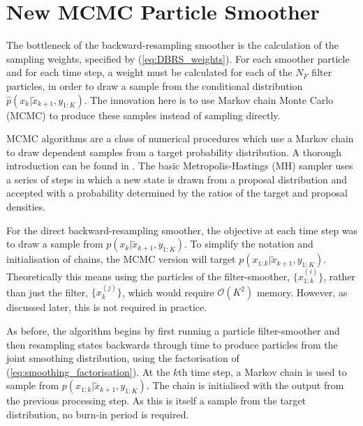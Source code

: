 \documentclass[10pt,twocolumn,twoside]{IEEEtran}
\begin{document}



\section{New MCMC Particle Smoother} \label{sec:mcmc_smoother}

The bottleneck of the backward-resampling smoother is the calculation of the sampling weights, specified by (\ref{eq:DBRS_weights}). For each smoother particle and for each time step, a weight must be calculated for each of the $N_F$ filter particles, in order to draw a sample from the conditional distribution $\hat{p}(x_k|\tilde{x}_{k+1}, y_{1:K})$. The innovation here is to use Markov chain Monte Carlo (MCMC) to produce these samples instead of sampling directly.

MCMC algorithms are a class of numerical procedures which use a Markov chain to draw dependent samples from a target probability distribution. A thorough introduction can be found in \cite{Gilks1996}. The basic Metropolis-Hastings (MH) \cite{Hastings1970} sampler uses a series of steps in which a new state is drawn from a proposal distribution and accepted with a probability determined by the ratios of the target and proposal densities.

For the direct backward-resampling smoother, the objective at each time step was to draw a sample from $p(x_{k}|\tilde{x}_{k+1}, y_{1:K})$. To simplify the notation and initialisation of chains, the MCMC version will target $p(x_{1:k}|\tilde{x}_{k+1}, y_{1:K})$. Theoretically this means using the particles of the filter-smoother, $\{x_{1:k}^{(i)}\}$, rather than just the filter, $\{x_k^{(j)}\}$, which would require $\mathcal{O}(K^2)$ memory. However, as discussed later, this is not required in practice.

As before, the algorithm begins by first running a particle filter-smoother and then resampling states backwards through time to produce particles from the joint smoothing distribution, using the factorisation of (\ref{eq:smoothing_factorisation}). At the $k$th time step, a Markov chain is used to sample from $p(x_{1:k}|\tilde{x}_{k+1}, y_{1:K})$. The chain is initialised with the output from the previous processing step. As this is itself a sample from the target distribution, no burn-in period is required.
\end{document}
